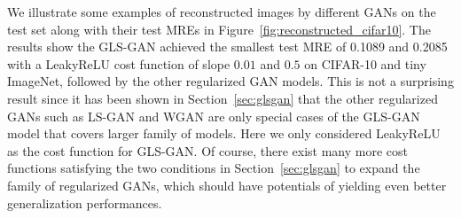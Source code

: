 We illustrate some examples of reconstructed images by different GANs on the test set along with their test MREs in Figure~\ref{fig:reconstructed_cifar10}.
The results show the GLS-GAN achieved the smallest test MRE of 0.1089 and 0.2085 with a LeakyReLU cost function of slope $0.01$ and $0.5$ on CIFAR-10 and tiny ImageNet, followed by the other regularized GAN models.
This is not a surprising result since it has been shown in Section~\ref{sec:glsgan} that the other regularized GANs such as LS-GAN and WGAN are only special cases of the GLS-GAN model that covers larger family of models. Here we only considered LeakyReLU as the cost function for GLS-GAN. Of course, there exist many more cost functions satisfying the two conditions in Section~\ref{sec:glsgan}  to expand the family of regularized GANs, which should have potentials of yielding even better generalization performances.






